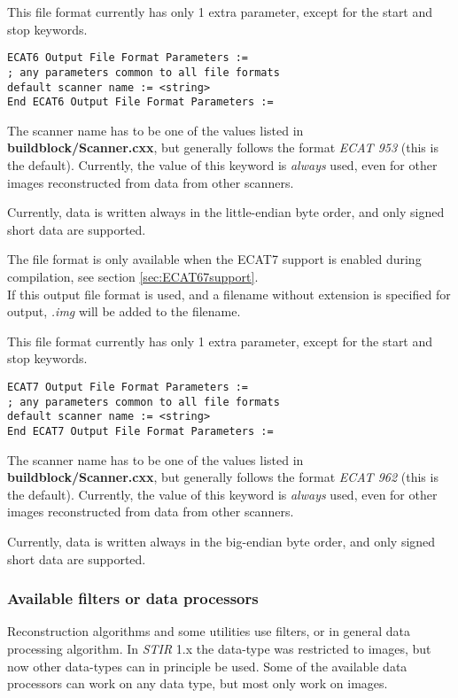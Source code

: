 \documentclass{article}
\begin{document}
{ 
}

This file format currently has only 1 extra parameter, except 
for the start and stop keywords.

\begin{verbatim}
ECAT6 Output File Format Parameters :=
; any parameters common to all file formats
default scanner name := <string>
End ECAT6 Output File Format Parameters :=
\end{verbatim}

The scanner name has to be one of the values listed in \textbf{buildblock/Scanner.cxx}, 
but generally follows the format \textit{ECAT 953} (this is the default). 
Currently, the value of this keyword is \textit{always} used, even 
for other images reconstructed from data from other scanners.

Currently, data is written always in the little-endian byte order, 
and only signed short data are supported.

{ 
}

The file format is only available when the ECAT7 support is enabled 
during compilation, see section \ref{sec:ECAT67support}.\\
If this output file format is used, and a filename without extension 
is specified for output, \textit{.img} will be added to the filename.

{ 
}

This file format currently has only 1 extra parameter, except 
for the start and stop keywords.

\begin{verbatim}
ECAT7 Output File Format Parameters :=
; any parameters common to all file formats
default scanner name := <string>
End ECAT7 Output File Format Parameters :=
\end{verbatim}

The scanner name has to be one of the values listed in \textbf{buildblock/Scanner.cxx}, 
but generally follows the format \textit{ECAT 962} (this is the default). 
Currently, the value of this keyword is \textit{always} used, even 
for other images reconstructed from data from other scanners.


Currently, data is written always in the big-endian byte order, 
and only signed short data are supported.



\subsubsection{
Available filters or data processors}
\label{sec:filters}
Reconstruction algorithms and some utilities use filters, or in 
general data processing algorithm. In \textit{STIR} 1.x the data-type was restricted
to images, but now other data-types can in principle be used. Some
of the available data processors can work on any data type, but most
only work on images.
\end{document}
